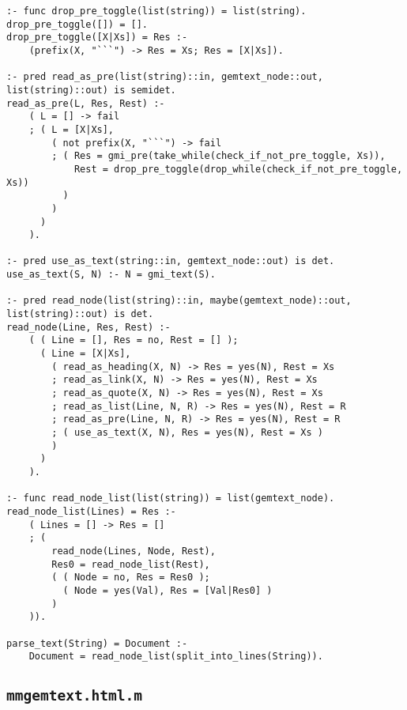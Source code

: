 \begin{lstlisting}[language=Mercury]
:- func drop_pre_toggle(list(string)) = list(string).
drop_pre_toggle([]) = [].
drop_pre_toggle([X|Xs]) = Res :-
	(prefix(X, "```") -> Res = Xs; Res = [X|Xs]).

:- pred read_as_pre(list(string)::in, gemtext_node::out, list(string)::out) is semidet.
read_as_pre(L, Res, Rest) :-
	( L = [] -> fail
	; ( L = [X|Xs],
		( not prefix(X, "```") -> fail
		; ( Res = gmi_pre(take_while(check_if_not_pre_toggle, Xs)),
			Rest = drop_pre_toggle(drop_while(check_if_not_pre_toggle, Xs))
		  )
		)
	  )
	).

:- pred use_as_text(string::in, gemtext_node::out) is det.
use_as_text(S, N) :- N = gmi_text(S).

:- pred read_node(list(string)::in, maybe(gemtext_node)::out, list(string)::out) is det.
read_node(Line, Res, Rest) :-
	( ( Line = [], Res = no, Rest = [] );
	  ( Line = [X|Xs], 
		( read_as_heading(X, N) -> Res = yes(N), Rest = Xs
		; read_as_link(X, N) -> Res = yes(N), Rest = Xs
		; read_as_quote(X, N) -> Res = yes(N), Rest = Xs
		; read_as_list(Line, N, R) -> Res = yes(N), Rest = R
		; read_as_pre(Line, N, R) -> Res = yes(N), Rest = R
		; ( use_as_text(X, N), Res = yes(N), Rest = Xs )
		)
	  )
	).

:- func read_node_list(list(string)) = list(gemtext_node).
read_node_list(Lines) = Res :-
	( Lines = [] -> Res = []
	; (
		read_node(Lines, Node, Rest),
		Res0 = read_node_list(Rest),
		( ( Node = no, Res = Res0 );
		  ( Node = yes(Val), Res = [Val|Res0] )
		)
	)).

parse_text(String) = Document :-
	Document = read_node_list(split_into_lines(String)).
\end{lstlisting}


\subsection{\texttt{mmgemtext.html.m}}

